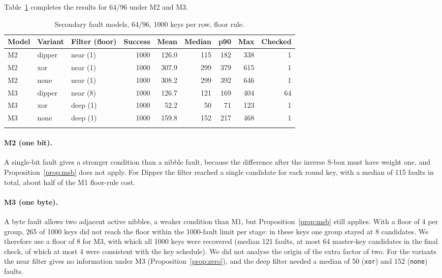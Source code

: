 \documentclass[pdflatex,sn-mathphys-num]{sn-jnl}
\theoremstyle{thmstyleone}%
\theoremstyle{thmstylethree}%
\begin{document}
Table~\ref{tab:secondary} completes the results for 64/96 under M2 and M3.

\begin{table}[t]
\caption{Secondary fault models, 64/96, 1000 keys per row, floor rule.}\label{tab:secondary}
\begin{tabular*}{\textwidth}{@{\extracolsep\fill}lllrrrrrr@{}}
\toprule
Model & Variant & Filter (floor) & Success & Mean & Median & p90 & Max & Checked\\
\midrule
M2 & dipper & near (1) & 1000 & 126.0 & 115 & 182 & 338 & 1\\
M2 & xor & near (1) & 1000 & 307.9 & 299 & 379 & 615 & 1\\
M2 & none & near (1) & 1000 & 308.2 & 299 & 392 & 646 & 1\\
\midrule
M3 & dipper & near (8) & 1000 & 126.7 & 121 & 169 & 404 & 64\\
M3 & xor & deep (1) & 1000 & 52.2 & 50 & 71 & 123 & 1\\
M3 & none & deep (1) & 1000 & 159.8 & 152 & 217 & 468 & 1\\
\botrule
\end{tabular*}
\end{table}

\paragraph{M2 (one bit).} A single-bit fault gives a stronger condition than a nibble fault, because the
difference after the inverse S-box must have weight one, and Proposition~\ref{prop:msb} does not apply.
For Dipper the filter reached a single candidate for each round key, with a median of 115 faults in total,
about half of the M1 floor-rule cost.

\paragraph{M3 (one byte).} A byte fault allows two adjacent active nibbles, a weaker condition than M1, but
Proposition~\ref{prop:msb} still applies. With a floor of 4 per group, 265 of 1000 keys did not reach the
floor within the 1000-fault limit per stage: in these keys one group stayed at 8 candidates. We therefore
use a floor of 8 for M3, with which all 1000 keys were recovered (median 121 faults, at most 64 master-key
candidates in the final check, of which at most 4 were consistent with the key schedule). We did not
analyse the origin of the extra factor of two. For the variants the near filter gives no information under
M3 (Proposition~\ref{prop:zero}), and the deep filter needed a median of 50 (\texttt{xor}) and 152
(\texttt{none}) faults.
\end{document}
